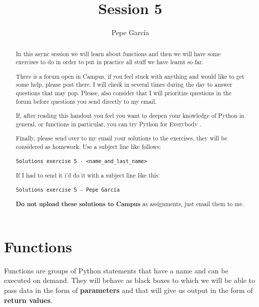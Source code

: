 \documentclass{tufte-handout}
\title{Session 5}
\author[Pepe García]{Pepe García}
\begin{document}
\maketitle%

\begin{abstract}
\noindent
In this async session we will learn about functions and then we will
have some exercises to do in order to put in practice all stuff we
have learnt so far.

There is a forum open in Campus, if you feel stuck with anything and
would like to get some help, please post there.  I will check in
several times during the day to answer questions that may pop.
Please, also consider that I will prioritize questions in the forum
before questions you send directly to my email.

If, after reading this handout you feel you want to deepen your
knowledge of Python in general, or functions in particular, you can
try Python for Everybody \cite{py4e}.

Finally, please send over to my email your solutions to the exercises,
they will be considered as homework.  Use a subject line like follows:

\begin{verbatim}
Solutions exercise 5 - <name_and_last_name>
\end{verbatim}

If I had to send it i'd do it with a subject line like this:

\begin{verbatim}
Solutions exercise 5 - Pepe García
\end{verbatim}

\textbf{Do not upload these solutions to Campus} as assignments, just email
them to me.

\end{abstract}


\section{Functions}\label{sec:functions}

Functions are groups of Python statements that have a name and can be
executed on demand.  They will behave as black boxes to which we will
be able to pass data in the form of \textbf{parameters} and that will give
us output in the form of \textbf{return values}.
\end{document}
